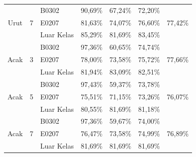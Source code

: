 \begin{enumerate}[a.]
\begin{enumerate}
\begin{table}[H]
\begin{tabular}{|c|c|l|c|c|c|c|}
			      \multirow{3}{*}{Urut} & \multirow{3}{*}{7} & B0302                            & 90,69\%   & 67,24\% & 72,20\%   & \multirow{3}{*}{77,42\%} \\ \cline{3-6}
			                            &                    & E0207                            & 81,63\%   & 74,07\% & 76,60\%   &                          \\ \cline{3-6}
			                            &                    & Luar Kelas                       & 85,29\%   & 81,69\% & 83,45\%   &                          \\ \hline
			      \multirow{3}{*}{Acak} & \multirow{3}{*}{3} & B0302                            & 97,36\%   & 60,65\% & 74,74\%   & \multirow{3}{*}{77,66\%} \\ \cline{3-6}
			                            &                    & E0207                            & 78,00\%   & 73,58\% & 75,72\%   &                          \\ \cline{3-6}
			                            &                    & Luar Kelas                       & 81,94\%   & 83,09\% & 82,51\%   &                          \\ \hline
			      \multirow{3}{*}{Acak} & \multirow{3}{*}{5} & B0302                            & 97,43\%   & 59,37\% & 73,78\%   & \multirow{3}{*}{76,07\%} \\ \cline{3-6}
			                            &                    & E0207                            & 75,51\%   & 71,15\% & 73,26\%   &                          \\ \cline{3-6}
			                            &                    & Luar Kelas                       & 80,55\%   & 81,69\% & 81,18\%   &                          \\ \hline
			      \multirow{3}{*}{Acak} & \multirow{3}{*}{7} & B0302                            & 97,36\%   & 59,67\% & 74,00\%   & \multirow{3}{*}{76,89\%} \\ \cline{3-6}
			                            &                    & E0207                            & 76,47\%   & 73,58\% & 74,99\%   &                          \\ \cline{3-6}
			                            &                    & Luar Kelas                       & 81,69\%   & 81,69\% & 81,69\%   &                          \\ \hline
		      \end{tabular}
	      \end{table}



\end{enumerate}
\end{enumerate}
